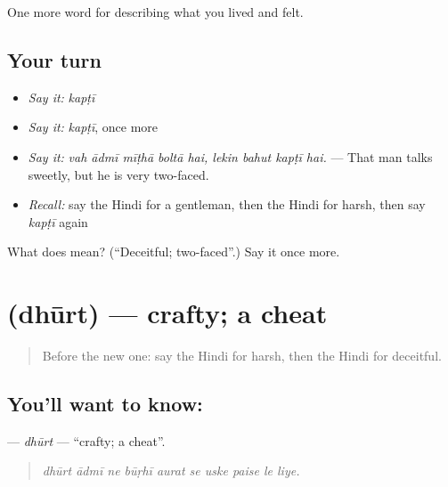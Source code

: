 \begin{grammarlens}[title={What you've built}]
One more word for describing what you lived and felt.
\end{grammarlens}

\subsection*{Your turn}
\begin{itemize}
\raggedright
  \item \emph{Say it:} \emph{kapṭī}
  \item \emph{Say it:} \emph{kapṭī}, once more
  \item \emph{Say it:} \emph{vah ādmī mīṭhā boltā hai, lekin bahut kapṭī hai.} — That man talks sweetly, but he is very two-faced.
  \item \emph{Recall:} say the Hindi for a gentleman, then the Hindi for harsh, then say \emph{kapṭī} again
\end{itemize}

\begin{tcolorbox}[breakable,colback=teal!4,colframe=teal!35!black,title={Before you move on}]
What does  mean? (\textquotedblleft{}Deceitful; two-faced\textquotedblright{}.) Say it once more.
\end{tcolorbox}
\section[\texorpdfstring{\hi{धूर्त} (dhūrt)}{धूर्त (dhūrt)}]{ (dhūrt) — crafty; a cheat}

\label{lesson:HI-C467-dhurt}



\begin{quote}
Before the new one: say the Hindi for harsh, then the Hindi for deceitful.
\end{quote}

\subsection*{You'll want to know: }
\textbf{} — \emph{dhūrt} — \textquotedblleft{}crafty; a cheat\textquotedblright{}.

\begin{quote}
         
\end{quote}

\begin{quote}
\emph{dhūrt ādmī ne būṛhī aurat se uske paise le liye.}
\end{quote}

